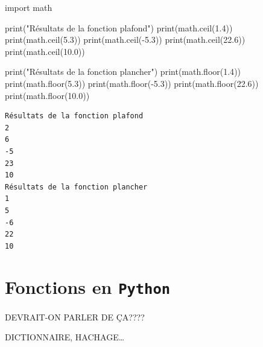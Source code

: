 \documentclass[
  letterpaper,
]{scrbook}
\newenvironment{Shaded}{}{}
\newcommand{\BuiltInTok}[1]{#1}
\newcommand{\FloatTok}[1]{\textcolor[rgb]{0.25,0.63,0.44}{#1}}
\newcommand{\ImportTok}[1]{#1}
\newcommand{\NormalTok}[1]{#1}
\newcommand{\OperatorTok}[1]{\textcolor[rgb]{0.40,0.40,0.40}{#1}}
\newcommand{\StringTok}[1]{\textcolor[rgb]{0.25,0.44,0.63}{#1}}
\theoremstyle{plain}
\theoremstyle{definition}
\theoremstyle{definition}
\theoremstyle{remark}
\begin{document}
\hypertarget{fonctions-planchers-plafonds}{}
\begin{Shaded}
\begin{Highlighting}[]
\ImportTok{import}\NormalTok{ math}

\BuiltInTok{print}\NormalTok{(}\StringTok{"Résultats de la fonction plafond"}\NormalTok{)}
\BuiltInTok{print}\NormalTok{(math.ceil(}\FloatTok{1.4}\NormalTok{))}
\BuiltInTok{print}\NormalTok{(math.ceil(}\FloatTok{5.3}\NormalTok{))}
\BuiltInTok{print}\NormalTok{(math.ceil(}\OperatorTok{{-}}\FloatTok{5.3}\NormalTok{))}
\BuiltInTok{print}\NormalTok{(math.ceil(}\FloatTok{22.6}\NormalTok{))}
\BuiltInTok{print}\NormalTok{(math.ceil(}\FloatTok{10.0}\NormalTok{))}

\BuiltInTok{print}\NormalTok{(}\StringTok{"Résultats de la fonction plancher"}\NormalTok{)}
\BuiltInTok{print}\NormalTok{(math.floor(}\FloatTok{1.4}\NormalTok{))}
\BuiltInTok{print}\NormalTok{(math.floor(}\FloatTok{5.3}\NormalTok{))}
\BuiltInTok{print}\NormalTok{(math.floor(}\OperatorTok{{-}}\FloatTok{5.3}\NormalTok{))}
\BuiltInTok{print}\NormalTok{(math.floor(}\FloatTok{22.6}\NormalTok{))}
\BuiltInTok{print}\NormalTok{(math.floor(}\FloatTok{10.0}\NormalTok{))}
\end{Highlighting}
\end{Shaded}

\begin{verbatim}
Résultats de la fonction plafond
2
6
-5
23
10
Résultats de la fonction plancher
1
5
-6
22
10
\end{verbatim}

\hypertarget{fonctions-en-python}{%
\section{\texorpdfstring{Fonctions en
\texttt{Python}}{Fonctions en Python}}\label{fonctions-en-python}}

DEVRAIT-ON PARLER DE ÇA????

DICTIONNAIRE, HACHAGE\ldots{}
\end{document}
